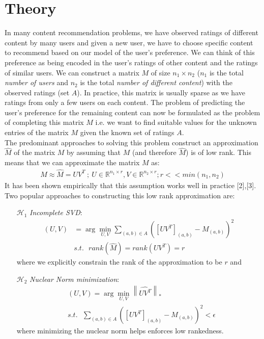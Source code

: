 \documentclass{article} %
\begin{document}
\section{Theory}
In many content recommendation problems, we have observed ratings of different content by many users and given a new user, we have to choose specific content to recommend based on our model of the user's preference. We can think of this preference as being encoded in the user's ratings of other content and the ratings of similar users. We can construct a matrix $M$ of size $n_1 \times n_2$ ($n_1$ is the total \emph{number of users} and $n_2$ is the total \emph{number of different content}) with the observed ratings (set $A$). In practice, this matrix is usually sparse as we have ratings from only a few users on each content. The problem of predicting the user's preference for the remaining content can now be formulated as the problem of completing this matrix $M$ i.e. we want to find suitable values for the unknown entries of the matrix $M$ given the known set of ratings $A$. \\
The predominant approaches to solving this problem construct an approximation $\hat{M}$ of the matrix $M$ by assuming that $M$ (and therefore $\hat{M}$) is of low rank. This means that we can approximate the matrix $M$ as:
\begin{align}
M \approx \hat{M} = UV^T \ ; \ U \in \mathbb{R}^{n_1 \times r}, V \in \mathbb{R}^{n_2 \times r}; r << min(n_1,n_2)
\end{align} 
It has been shown empirically that this assumption works well in practice [2],[3]. Two popular approaches to constructing this low rank approximation are:
\begin{itemize}
\item[$\mathcal{H}_1$] \emph{Incomplete SVD}: 
\begin{align}
(U,V) &= \arg \min_{U,V} \sum_{(a,b) \in A} \left([UV^T]_{(a,b)} - M_{(a,b)}\right)^2 \\
&s.t. \ \ \ rank(\hat{M}) = rank(UV^T) = r
\end{align}
where we explicitly constrain the rank of the approximation to be $r$ and
\item[$\mathcal{H}_2$] \emph{Nuclear Norm minimization}:
\begin{align}
&(U,V) = \arg \min_{U,V} \left\| \hat{UV^T} \right\|_* \\
&s.t. \ \ \ \sum_{(a,b) \in A} \left([UV^T]_{(a,b)} - M_{(a,b)}\right)^2 < \epsilon
\end{align}
where minimizing the nuclear norm helps enforces low rankedness.
\end{itemize}
\end{document}
